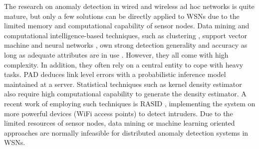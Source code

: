 The research on anomaly detection in wired and wireless ad hoc networks is quite mature, but only a few solutions can be directly applied to WSNs due to the limited memory and computational capability of sensor nodes. Data mining and computational intelligence-based techniques, such as clustering \cite{4085803}, support vector machine \cite{4289308} and neural networks \cite{4797294}, own strong detection generality and accuracy as long as adequate attributes are in use \cite{1988328}. However, they all come with high complexity. In addition, they often rely on a central entity to cope with heavy tasks. PAD \cite{5356174} deduces link level errors with a probabilistic inference model maintained at a server. Statistical techniques such as kernel density estimator also require high computational capability to generate the density estimator. A recent work of employing such techniques is RASID \cite{6199865}, implementing the system on more powerful devices (WiFi access points) to detect intruders. Due to the limited resources of sensor nodes, data mining or machine learning oriented approaches are normally infeasible for distributed anomaly detection systems in WSNs. 


